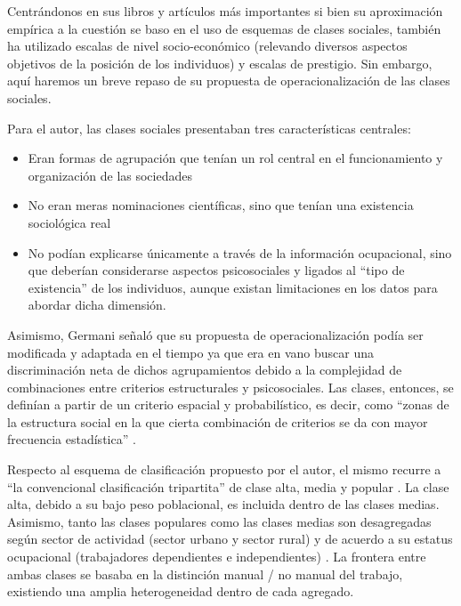 \documentclass[
]{book}
\begin{document}
Centrándonos en sus libros y artículos más importantes \citep{Germani1955, Germani1963, Germani2010} si bien su aproximación empírica a la cuestión se baso en el uso de esquemas de clases sociales, también ha utilizado escalas de nivel socio-económico (relevando diversos aspectos objetivos de la posición de los individuos) y escalas de prestigio. Sin embargo, aquí haremos un breve repaso de su propuesta de operacionalización de las clases sociales.

Para el autor, las clases sociales presentaban tres características centrales:

\begin{itemize}
\item
  Eran formas de agrupación que tenían un rol central en el funcionamiento y organización de las sociedades
\item
  No eran meras nominaciones científicas, sino que tenían una existencia sociológica real
\item
  No podían explicarse únicamente a través de la información ocupacional, sino que deberían considerarse aspectos psicosociales y ligados al ``tipo de existencia'' de los individuos, aunque existan limitaciones en los datos para abordar dicha dimensión.
\end{itemize}

Asimismo, Germani señaló que su propuesta de operacionalización podía ser modificada y adaptada en el tiempo ya que era en vano buscar una discriminación neta de dichos agrupamientos debido a la complejidad de combinaciones entre criterios estructurales y psicosociales. Las clases, entonces, se definían a partir de un criterio espacial y probabilístico, es decir, como ``zonas de la estructura social en la que cierta combinación de criterios se da con mayor frecuencia estadística'' \citep[pp.~143]{Germani1955}.

Respecto al esquema de clasificación propuesto por el autor, el mismo recurre a ``la convencional clasificación tripartita'' de clase alta, media y popular \citeyearpar[pp.~146]{Germani1955}. La clase alta, debido a su bajo peso poblacional, es incluida dentro de las clases medias. Asimismo, tanto las clases populares como las clases medias son desagregadas según sector de actividad (sector urbano y sector rural) y de acuerdo a su estatus ocupacional (trabajadores dependientes e independientes) \citeyearpar[pp.~146-147]{Germani1955}. La frontera entre ambas clases se basaba en la distinción manual / no manual del trabajo, existiendo una amplia heterogeneidad dentro de cada agregado.
\end{document}
